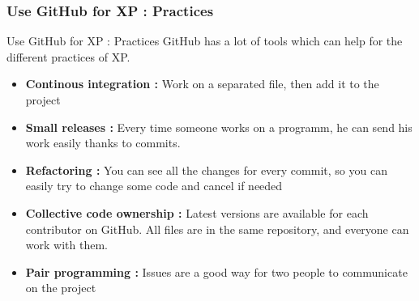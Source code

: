\begin{frame}

    \frametitle{Use GitHub for XP : Practices}
    \begin{block}{Use GitHub for XP : Practices}
    GitHub has a lot of tools which can help for the different practices of XP.
        \begin{itemize}
        	\item \textbf{Continous integration :} Work on a separated file, then add it to the project \pause
        	\item \textbf{Small releases :} Every time someone works on a programm, he can send his work easily thanks to commits. \pause
        	 \item \textbf{Refactoring :} You can see all the changes for every commit, so you can easily try to change some code and cancel if needed
        	 \item \textbf{Collective code ownership :} Latest versions are available for each contributor on GitHub. All files are in the same repository, and everyone can work with them. \pause
        	 \item \textbf{Pair programming :} Issues are a good way for two people to communicate on the project
        \end{itemize}
    \end{block}
   
\end{frame}